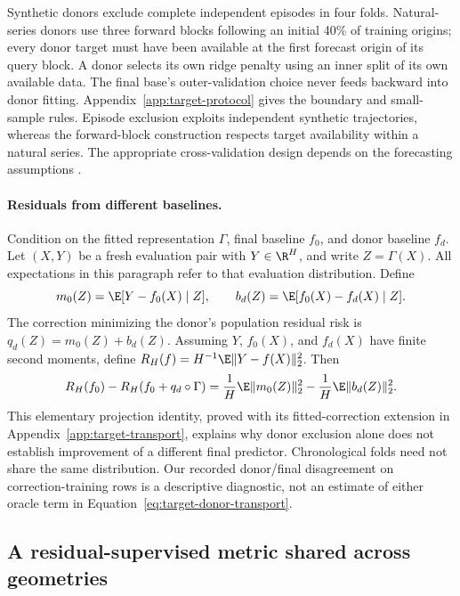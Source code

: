 Synthetic donors exclude complete independent episodes in four folds.
Natural-series donors use three forward blocks following an initial 40\%
of training origins; every donor target must have been available at the
first forecast origin of its query block. A donor selects its own ridge
penalty using an inner split of its own available data. The final base's
outer-validation choice never feeds backward into donor fitting.
Appendix~\ref{app:target-protocol} gives the boundary and small-sample
rules. Episode exclusion exploits independent synthetic trajectories, whereas
the forward-block construction respects target availability within a
natural series. The appropriate cross-validation design depends on
the forecasting assumptions \citep{Bergmeir2018CV}.

\paragraph{Residuals from different baselines.}
Condition on the fitted representation $\Gamma$, final baseline
$f_0$, and donor baseline $f_d$. Let $(X,Y)$ be a fresh evaluation
pair with $Y\in\R^H$, and write $Z=\Gamma(X)$. All expectations
in this paragraph refer to that evaluation distribution. Define
\[
 m_0(Z)=\E[Y-f_0(X)\mid Z],\qquad
 b_d(Z)=\E[f_0(X)-f_d(X)\mid Z].
\]
The correction minimizing the donor's population residual risk is
$q_d(Z)=m_0(Z)+b_d(Z)$. Assuming $Y$, $f_0(X)$, and $f_d(X)$ have
finite second moments, define $R_H(f)=H^{-1}\E\|Y-f(X)\|_2^2$. Then
\begin{equation}
 R_H(f_0)-R_H(f_0+q_d\circ\Gamma)
 =\frac1H\E\|m_0(Z)\|_2^2-\frac1H\E\|b_d(Z)\|_2^2.
 \label{eq:target-donor-transport}
\end{equation}
This elementary projection identity, proved with its fitted-correction
extension in Appendix~\ref{app:target-transport}, explains why donor
exclusion alone does not establish improvement of a different final
predictor. Chronological folds need not share the same distribution. Our recorded
donor/final disagreement on correction-training rows is a descriptive
diagnostic, not an estimate of either oracle term in
Equation~\eqref{eq:target-donor-transport}.

\subsection{A residual-supervised metric shared across geometries}
\label{sec:target-metric}

